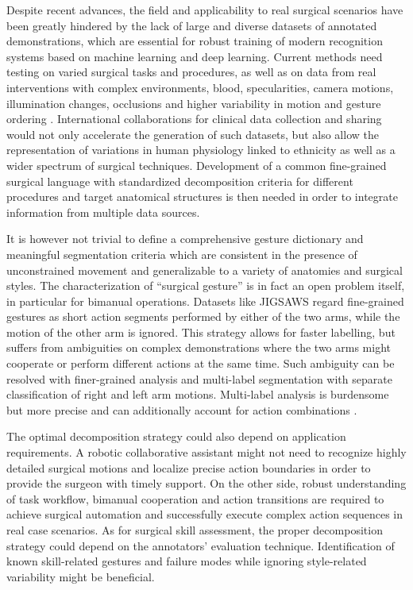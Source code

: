 \documentclass[journal]{IEEEtran}
\begin{document}
Despite recent advances, the field and applicability to real surgical scenarios have been greatly hindered by the lack of large and diverse datasets of annotated demonstrations, which are essential for robust training of modern recognition systems based on machine learning and deep learning. 
Current methods need testing on varied surgical tasks and procedures, as well as on data from real interventions with complex environments, blood, specularities, camera motions, illumination changes, occlusions and higher variability in motion and gesture ordering \cite{Qin2020, Luongo2020, Bawa2020}.
International collaborations for clinical data collection and sharing would not only accelerate the generation of such datasets, but also allow the representation of variations in human physiology linked to ethnicity as well as a wider spectrum of surgical techniques. 
Development of a common fine-grained surgical language with standardized decomposition criteria for different procedures and target anatomical structures is then needed in order to integrate information from multiple data sources.

It is however not trivial to define a comprehensive gesture dictionary and meaningful segmentation criteria which are consistent in the presence of unconstrained movement and generalizable to a variety of anatomies and surgical styles.
The characterization of ``surgical gesture'' is in fact an open problem itself, in particular for bimanual operations. Datasets like JIGSAWS regard fine-grained gestures as short action segments performed by either of the two arms, while the motion of the other arm is ignored. This strategy allows for faster labelling, but suffers from ambiguities on complex demonstrations where the two arms might cooperate or perform different actions at the same time. Such ambiguity can be resolved with finer-grained analysis and multi-label segmentation with separate classification of right and left arm motions. Multi-label analysis is burdensome but more precise and can additionally account for action combinations \cite{Chen2018}.

The optimal decomposition strategy could also depend on application requirements. A robotic collaborative assistant might not need to recognize highly detailed surgical motions and localize precise action boundaries in order to provide the surgeon with timely support. 
On the other side, robust understanding of task workflow, bimanual cooperation and action transitions are required to achieve surgical automation and successfully execute complex action sequences in real case scenarios.
As for surgical skill assessment, the proper decomposition strategy could depend on the annotators' evaluation technique. Identification of known skill-related gestures and failure modes while ignoring style-related variability might be beneficial.
\end{document}
